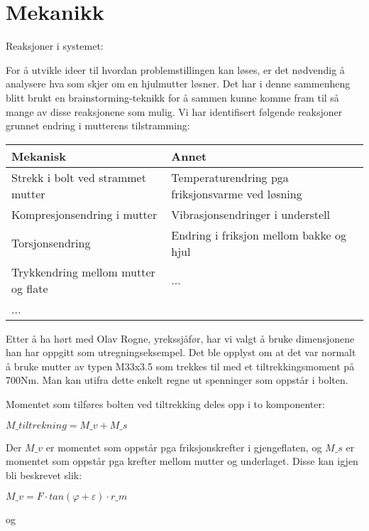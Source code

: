 \chapter{Mekanikk}
Reaksjoner i systemet:

For å utvikle ideer til hvordan problemstillingen kan løses, er det nødvendig å analysere hva som skjer om en hjulmutter løsner. Det har i denne sammenheng blitt brukt en brainstorming-teknikk for å sammen kunne komme fram til så mange av disse reaksjonene som mulig. Vi har identifisert følgende reaksjoner grunnet endring i mutterens tilstramming:

\begin{table}[h]
\begin{tabular}{|l|l|}
\hline
\textbf{Mekanisk}                   & \textbf{Annet}                                   \\
\hline
Strekk i bolt ved strammet mutter   & Temperaturendring pga friksjonsvarme ved løsning \\
\hline
Kompresjonsendring i mutter         & Vibrasjonsendringer i understell                 \\
\hline
Torsjonsendring                     & Endring i friksjon mellom bakke og hjul          \\
\hline
Trykkendring mellom mutter og flate & ...                                              \\
\hline
...                                 &                                                 \\
\hline
\end{tabular}
\end{table}

Etter å ha hørt med Olav Rogne, yrekssjåfør, har vi valgt å bruke dimensjonene han har oppgitt som utregningseksempel. Det ble opplyst om at det var normalt å bruke mutter av typen M33x3.5 som trekkes til med et tiltrekkingsmoment på 700Nm. Man kan utifra dette enkelt regne ut spenninger som oppstår i bolten.

Momentet som tilføres bolten ved tiltrekking deles opp i to komponenter:

$M\_{tiltrekning}=M\_{v}+M\_{s}$

Der $M\_{v}$ er momentet som oppstår pga friksjonskrefter i gjengeflaten, og $M\_{s}$ er momentet som oppstår pga krefter mellom mutter og underlaget. Disse kan igjen bli beskrevet slik:

$M\_{v}=F\cdot tan(\varphi +\varepsilon )\cdot r\_{m}$

og

